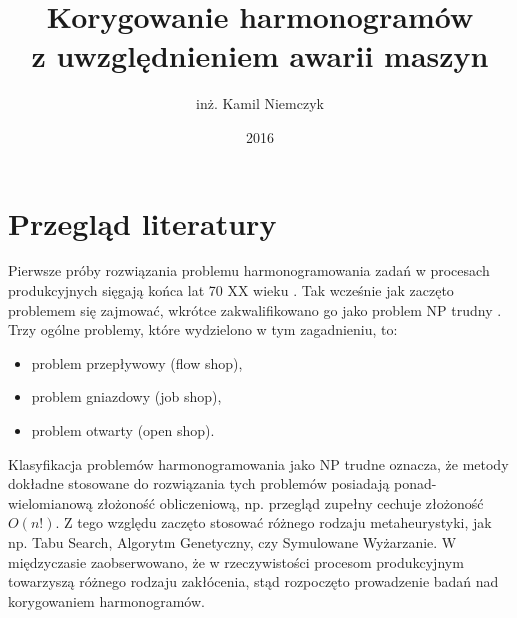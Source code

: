 \documentclass[printmode,oneside]{mgr}
\title{Korygowanie harmonogramów\\ z uwzględnieniem awarii maszyn}
\author{inż. Kamil Niemczyk}
\date{2016} %
\begin{document}

\maketitle %
\cleardoublepage
\tableofcontents %
\cleardoublepage
%
%
%
%
%
%
%
\chapter{Przegląd literatury}
Pierwsze próby rozwiązania problemu harmonogramowania zadań w procesach produkcyjnych sięgają końca lat 70 XX wieku \cite{Garey76}. Tak wcześnie jak zaczęto problemem się zajmować, wkrótce zakwalifikowano go jako problem NP trudny \cite{Garey76, Nawaz83}. Trzy ogólne problemy, które wydzielono w tym zagadnieniu, to:
\begin{itemize}
    \item problem przepływowy (flow shop),
    \item problem gniazdowy (job shop),
    \item problem otwarty (open shop).
\end{itemize}
Klasyfikacja problemów harmonogramowania jako NP trudne oznacza, że metody dokładne stosowane do rozwiązania tych problemów posiadają ponad-wielomianową złożoność obliczeniową, np. przegląd zupełny cechuje złożoność $O(n!)$. Z tego względu zaczęto stosować różnego rodzaju metaheurystyki, jak np. Tabu Search, Algorytm Genetyczny, czy Symulowane Wyżarzanie. W międzyczasie zaobserwowano, że w rzeczywistości procesom produkcyjnym towarzyszą różnego rodzaju zakłócenia, stąd rozpoczęto prowadzenie badań nad korygowaniem harmonogramów.
%
\end{document}
